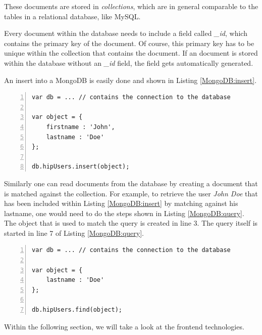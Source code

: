 These documents are stored in \emph{collections}, which are in general comparable to the tables in a relational database, like MySQL.

Every document within the database needs to include a field called \textit{\_id}, which contains the primary key of the document. Of course, this primary key has to be unique within the collection that contains the document. If an document is stored within the database without an \textit{\_id} field, the field gets automatically generated.

An insert into a MongoDB is easily done and shown in Listing \ref{MongoDB:insert}. 

\begin{lstlisting}[numbers=left,caption={Inserting into a MongoDB},label=MongoDB:insert,frame=tlbr,breaklines]
var db = ... // contains the connection to the database

var object = {
	firstname : 'John',
	lastname : 'Doe'
};

db.hipUsers.insert(object);
\end{lstlisting}

Similarly one can read documents from the database by creating a document that is matched against the collection.
For example, to retrieve the user \textit{John Doe} that has been included within Listing \ref{MongoDB:insert} by matching against his lastname, one would need to do the steps shown in Listing \ref{MongoDB:query}. The object that is used to match the query is created in line 3. The query itself is started in line 7 of Listing \ref{MongoDB:query}.

\begin{lstlisting}[numbers=left,caption={Reading documents from a MongoDB},label=MongoDB:query,frame=tlbr,breaklines]
var db = ... // contains the connection to the database

var object = {
	lastname : 'Doe'
};

db.hipUsers.find(object);
\end{lstlisting}

Within the following section, we will take a look at the frontend technologies.


